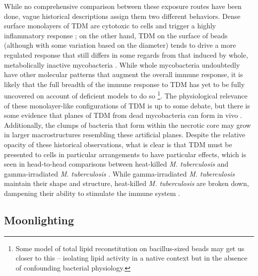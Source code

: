 While no comprehensive comparison between these exposure routes have been done, vague historical descriptions assign them two different behaviors. Dense surface monolayers of TDM are cytotoxic to cells and trigger a highly inflammatory response \citep{Retzinger1982, Schabbing1994, Hunter2006a}; on the other hand, TDM on the surface of beads (although with some variation based on the diameter) tends to drive a more regulated response that still differs in some regards from that induced by whole, metabolically inactive mycobacteria \citep{Bowdish2009}. While whole mycobacteria undoubtedly have other molecular patterns that augment the overall immune response, it is likely that the full breadth of the immune response to TDM has yet to be fully uncovered on account of deficient models to do so \footnote{Some model of total lipid reconstitution on bacillus-sized beads may get us closer to this -- isolating lipid activity in a native context but in the absence of confounding bacterial physiology.}. The physiological relevance of these monolayer-like configurations of TDM is up to some debate, but there is some evidence that planes of TDM from dead mycobacteria can form in vivo \citep{Hunter2006b, Glickman2008, Schabbing1994}. Additionally, the clumps of bacteria that form within the necrotic core may grow in larger macrostructures resembling these artificial planes. Despite the relative opacity of these historical observations, what is clear is that TDM must be presented to cells in particular arrangements to have particular effects, which is seen in head-to-head comparisons between heat-killed \textit{M. tuberculosis} and gamma-irradiated \textit{M. tuberculosis} \citep{Mosavari2021, Cha2015, Yang2018, Gleeson2016, Datta2006}. While gamma-irradiated \textit{M. tuberculosis} maintain their shape and structure, heat-killed \textit{M. tuberculosis} are broken down, dampening their ability to stimulate the immune system \citep{SecanellaFandos2014}. 

\subsection{Moonlighting}\label{moon}

